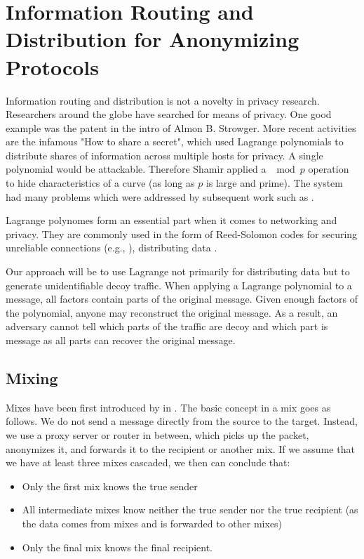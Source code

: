 \chapter[Information in Anonymizing Protocols]{Information Routing and Distribution for Anonymizing Protocols}
Information routing and distribution is not a novelty in privacy research. Researchers around the globe have searched for means of privacy.  One good example was the patent in the intro of Almon B. Strowger\cite{pulseDialingPatent}. More recent activities are the infamous "How to share a secret"\cite{shamir1979share}, which used Lagrange polynomials to distribute shares of information across multiple hosts for privacy. A single polynomial would be attackable. Therefore Shamir applied a $\mod p$ operation to hide characteristics of a curve (as long as $p$ is large and prime). The system had many problems which were addressed by subsequent work such as \cite{tompa1989share}.

Lagrange polynomes form an essential part when it comes to networking and privacy. They are commonly used in the form of Reed-Solomon codes for securing unreliable connections (e.g., \cite{aiache2008reed}), distributing data \cite{shamir1979share}.

Our approach will be to use Lagrange not primarily for distributing data but to generate unidentifiable decoy traffic. When applying a Lagrange polynomial to a message, all factors contain parts of the original message. Given enough factors of the polynomial, anyone may reconstruct the original message. As a result, an adversary cannot tell which parts of the traffic are decoy and which part is message as all parts can recover the original message.

\section{Mixing\label{sec:mixNets}}
Mixes have been first introduced by \cite{CHAUM1} in \citeyear{CHAUM1}. The basic concept in a mix goes as follows. We do not send a message directly from the source to the target. Instead, we use a proxy server or router in between, which picks up the packet, anonymizes it, and forwards it to the recipient or another mix. If we assume that we have at least three mixes cascaded, we then can conclude that:
\begin{itemize}
	\item Only the first mix knows the true sender
	\item All intermediate mixes know neither the true sender nor the true recipient (as the data comes from mixes and is forwarded to other mixes) 
	\item Only the final mix knows the final recipient.
\end{itemize}

